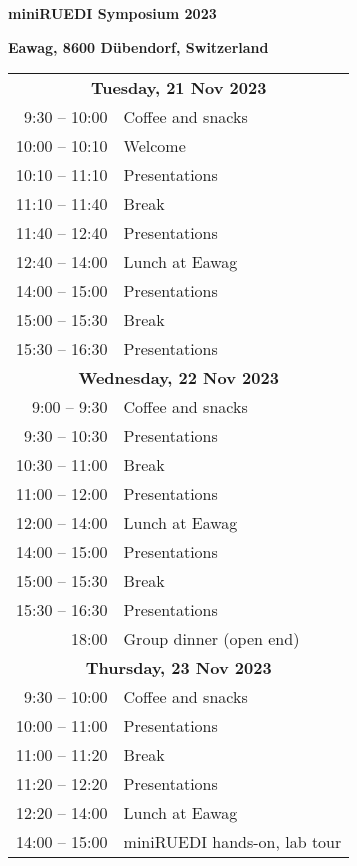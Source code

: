 \documentclass[12pt]{extbook}
\begin{document}
\thispagestyle{empty}
\begin{center}

{\LARGE \bf miniRUEDI Symposium 2023}

\bigskip
\bigskip
\bigskip

{\large \bf Eawag, 8600 Dübendorf, Switzerland}

\bigskip
\bigskip
\bigskip
\bigskip
\bigskip
\bigskip



\begin{tabular}{r@{\hskip 0.5in}l}

\multicolumn{2}{c}{\bf Tuesday, 21 Nov 2023}\\[2ex]
9:30  -- 10:00	&	Coffee and snacks\\
10:00 -- 10:10	&	Welcome\\
10:10 -- 11:10	&	Presentations\\   %
11:10 -- 11:40	&	Break\\
11:40 -- 12:40	& Presentations\\   %
12:40 -- 14:00	&	Lunch at Eawag\\
14:00 -- 15:00	&	Presentations\\   %
15:00 -- 15:30	&	Break\\
15:30 -- 16:30	&	Presentations\\[8ex]   %

\multicolumn{2}{c}{\bf Wednesday, 22 Nov 2023}\\[2ex]
9:00  -- 9:30	&	Coffee and snacks\\
9:30  -- 10:30	&	Presentations\\   %
10:30 -- 11:00	&	Break\\
11:00 -- 12:00	& Presentations\\   %
12:00 -- 14:00	&	Lunch at Eawag\\
14:00 -- 15:00	&	Presentations\\   %
15:00 -- 15:30	&	Break\\
15:30 -- 16:30	&	Presentations\\   %
18:00 \phantom{-- 00:00}	&	Group dinner (open end)\\[8ex]

\multicolumn{2}{c}{\bf Thursday, 23 Nov 2023}\\[2ex]
9:30  -- 10:00	&	Coffee and snacks\\   %
10:00 -- 11:00	&	Presentations\\
11:00 -- 11:20	&	Break\\
11:20 -- 12:20	& Presentations\\       %
12:20 -- 14:00	&	Lunch at Eawag\\
14:00 -- 15:00	&	miniRUEDI hands-on, lab tour\\[1.5ex]

\end{tabular}

\end{center}
\end{document}
